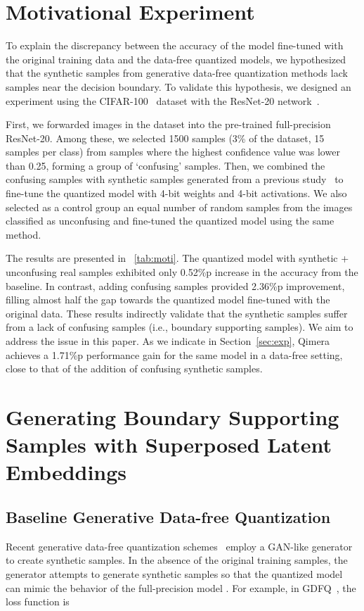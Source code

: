 \documentclass{article}
\newcommand{\aname}{Qimera\xspace}
\newcommand{\JL}[1]{{\color{magenta}[\textbf{\sc JLee}: \textit{#1}]}}
\newcommand{\KH}[1]{{\color{purple}[\textbf{\sc KH}: \textit{#1}]}}
\renewcommand{\JL}[1]{}
\renewcommand{\KH}[1]{}
\begin{document}
\section{Motivational Experiment}
To explain the discrepancy between the accuracy of the model fine-tuned with the original training data and the data-free quantized models, we hypothesized that the synthetic samples from generative data-free quantization methods lack samples near the decision boundary.
To validate this hypothesis, we designed an experiment using the CIFAR-100~\cite{cifar} dataset with the ResNet-20 network~\cite{resnet}. 


First, we forwarded images in the dataset into the pre-trained full-precision ResNet-20. 
Among these, we selected 1500 samples (3\% of the dataset, 15 samples per class) from samples where the highest confidence value was lower than 0.25, forming a group of ‘confusing’ samples.
Then, we combined the confusing samples with synthetic samples generated from a previous study~\cite{gdfq} to fine-tune the quantized model with 4-bit weights and 4-bit activations. 
We also selected as a control group an equal number of random samples from the images classified as unconfusing and fine-tuned the quantized model using the same method.


The results are presented in \tablename~\ref{tab:moti}.
The quantized model with synthetic + unconfusing real samples exhibited only 0.52\%p increase in the accuracy from the baseline.
In contrast, adding confusing samples provided 2.36\%p improvement, filling almost half the gap towards the quantized model fine-tuned with the original data. 
These results indirectly validate that the synthetic samples suffer from a lack of confusing samples (i.e., boundary supporting samples). 
We aim to address the issue in this paper.
As we indicate in Section~\ref{sec:exp}, \aname achieves a 1.71\%p \KH{CHECK!} performance gain for the same model in a data-free  setting, close to that of the addition of confusing synthetic samples.


\JL{somewhere: simple yet effective}




\section{Generating Boundary Supporting Samples with Superposed Latent Embeddings}
\label{sec:method}

\subsection{Baseline Generative Data-free Quantization}
\JL{maybe we will remove zaq from here}
Recent generative data-free quantization schemes~\cite{gdfq,zaq} employ a GAN-like generator to create synthetic samples. 
In the absence of the original training samples, the generator  attempts to generate synthetic samples so that the quantized model  can mimic the behavior of the full-precision model .
For example, in GDFQ~\cite{gdfq}, the loss function  is  
\end{document}

